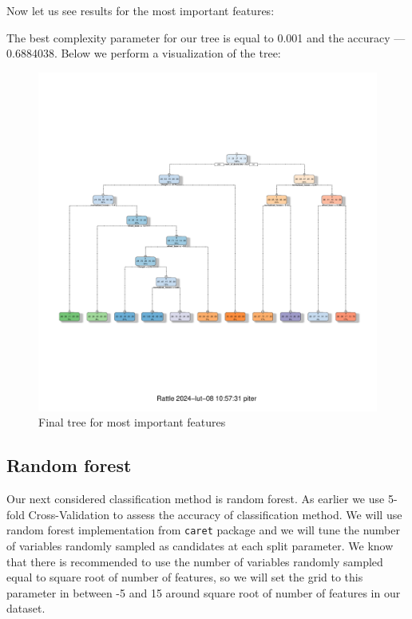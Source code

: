 \documentclass[11pt,a4paper]{article}\usepackage[]{graphicx}\usepackage[]{xcolor}
\makeatletter
\def\maxwidth{ %
  \ifdim\Gin@nat@width>\linewidth
    \linewidth
  \else
    \Gin@nat@width
  \fi
}
\newenvironment{knitrout}{}{} %
\makeatother
\begin{document}
Now let us see results for the most important features:
	


The best complexity parameter for our tree is equal to 0.001 and the accuracy --- 0.6884038. Below we perform a visualization of the tree:

\begin{knitrout}
\color{fgcolor}\begin{figure}
\includegraphics[width=\maxwidth]{figure/tree2-1} \caption[Final tree for most important features]{Final tree for most important features}\label{fig:tree2}
\end{figure}

\end{knitrout}
	
	\subsection{Random forest}
	Our next considered classification method is random forest. As earlier we use 5-fold Cross-Validation to assess the accuracy of classification method. We will use random forest implementation from \verb|caret| package and we will tune the number of variables randomly sampled as candidates at each split parameter. We know that there is recommended to use the number of variables randomly sampled equal to square root of number of features, so we will set the grid to this parameter in between -5 and 15 around square root of number of features in our dataset.
	
\end{document}
